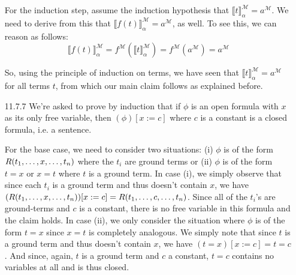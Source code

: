 \begin{itemize}
                    For the induction step, assume the induction
                    hypothesis that $\llbracket
                    t\rrbracket^\mathcal{M}_\alpha=a^\mathcal{M}$. We
                    need to derive from this that $\llbracket
                    f(t)\rrbracket^\mathcal{M}_\alpha=a^\mathcal{M}$,
                    as well. To see this, we can reason as follows:
                    \[\llbracket
                    f(t)\rrbracket^\mathcal{M}_\alpha=f^\mathcal{M}(\llbracket
                    t\rrbracket^\mathcal{M}_\alpha)=f^\mathcal{M}(a^\mathcal{M})=a^\mathcal{M}\]

                  So, using the principle of induction on terms, we
                  have seen that  $\llbracket
                    t\rrbracket^\mathcal{M}_\alpha=a^\mathcal{M}$ for
                    all terms $t$, from which our main claim follows
                    as explained before.

                  \item[11.7.7] We're asked to prove by induction that
                    if $\phi$ is an open formula with $x$ as its only
                    free variable, then $(\phi)[x:=c]$ where $c$ is a
                    constant is a closed formula, i.e. a sentence.

                    For the base case, we need to consider two
                    situations: (i) $\phi$ is of the form $R(t_1,
                    \mathellipsis, x, \mathellipsis, t_n)$ where the
                    $t_i$ are ground terms or (ii)
                    $\phi$ is of the form $t=x$ or $x=t$ where $t$ is
                    a ground term. In case (i),
                    we simply observe that since each $t_i$ is a
                    ground term and thus doesn't contain $x$, we have $(R(t_1,
                    \mathellipsis, x, \mathellipsis,
                    t_n))[x:=c]=R(t_1, \mathellipsis, c,\mathellipsis,
                    t_n)$. Since all of the $t_i$'s are ground-terms
                    and $c$ is a constant, there is no free variable
                    in this formula and the claim holds. In case (ii),
                    we only consider the situation where $\phi$ is of
                    the form $t=x$ since $x=t$ is completely
                    analogous. We simply note that  since $t$ is a
                    ground term and thus doesn't contain $x$, we have
                    $(t=x)[x:=c]=t=c$. And since, again, $t$ is a
                    ground term and $c$ a constant, $t=c$ contains no
                    variables at all and is thus closed.


\end{itemize}
